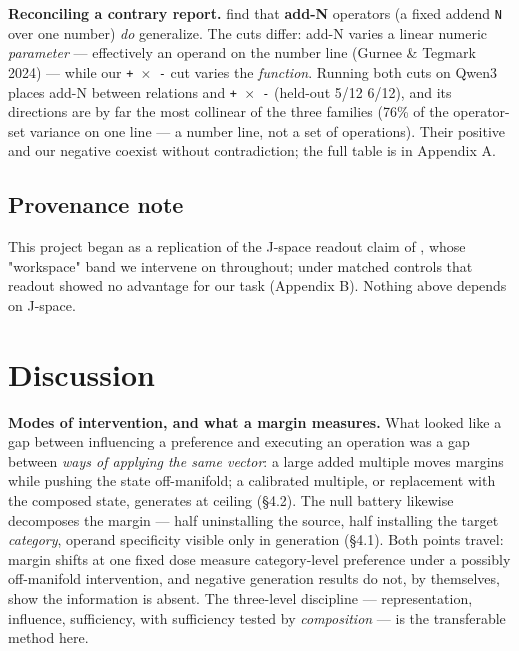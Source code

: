 \textbf{Reconciling a contrary report.} \citet{christ2025structure} find that
\textbf{add-N} operators (a fixed addend \texttt{N} over one number)
\emph{do} generalize. The cuts differ: add-N varies a linear numeric
\emph{parameter} --- effectively an operand on the number line (Gurnee
\& Tegmark 2024) --- while our \texttt{+\ \ensuremath{\times}\ -} cut varies the
\emph{function}. Running both cuts on Qwen3 places add-N between
relations and \texttt{+\ \ensuremath{\times}\ -} (held-out 5/12 \textperiodcentered{} 6/12), and its
directions are by far the most collinear of the three families (76\% of
the operator-set variance on one line --- a number line, not a set of
operations). Their positive and our negative coexist without
contradiction; the full table is in Appendix A.

\subsection{Provenance note}

This project began as a replication of the J-space readout claim of
\citealp{gurnee2026workspace}, whose "workspace" band we
intervene on throughout; under matched controls that readout showed no
advantage for our task (Appendix B). Nothing above depends on J-space.

\section{Discussion}

\textbf{Modes of intervention, and what a margin measures.} What looked
like a gap between influencing a preference and executing an operation
was a gap between \emph{ways of applying the same vector}: a large added
multiple moves margins while pushing the state off-manifold; a
calibrated multiple, or replacement with the composed state, generates
at ceiling (\S{}4.2). The null battery likewise decomposes the margin ---
half uninstalling the source, half installing the target
\emph{category}, operand specificity visible only in generation (\S{}4.1).
Both points travel: margin shifts at one fixed dose measure
category-level preference under a possibly off-manifold intervention,
and negative generation results do not, by themselves, show the
information is absent. The three-level discipline --- representation,
influence, sufficiency, with sufficiency tested by \emph{composition}
--- is the transferable method here.

